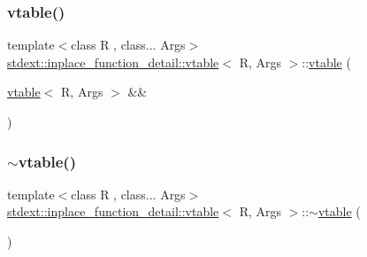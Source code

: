\mbox{\label{structstdext_1_1inplace__function__detail_1_1vtable_acd6e85bc1036c1681fcef551f9935062}} 
\subsubsection{\texorpdfstring{vtable()}{vtable()}\hspace{0.1cm}{\footnotesize\ttfamily [8/8]}}
{\footnotesize\ttfamily template$<$class R , class... Args$>$ \\
\hyperlink{structstdext_1_1inplace__function__detail_1_1vtable}{stdext\+::inplace\+\_\+function\+\_\+detail\+::vtable}$<$ R, Args $>$\+::\hyperlink{structstdext_1_1inplace__function__detail_1_1vtable}{vtable} (\begin{DoxyParamCaption}\item[{\hyperlink{structstdext_1_1inplace__function__detail_1_1vtable}{vtable}$<$ R, Args $>$ \&\&}]{ }\end{DoxyParamCaption})\hspace{0.3cm}{\ttfamily [delete]}}

\mbox{\label{structstdext_1_1inplace__function__detail_1_1vtable_a9358b57ba7aa53ea5209476490644148}} 
\subsubsection{\texorpdfstring{$\sim$vtable()}{~vtable()}\hspace{0.1cm}{\footnotesize\ttfamily [2/2]}}
{\footnotesize\ttfamily template$<$class R , class... Args$>$ \\
\hyperlink{structstdext_1_1inplace__function__detail_1_1vtable}{stdext\+::inplace\+\_\+function\+\_\+detail\+::vtable}$<$ R, Args $>$\+::$\sim$\hyperlink{structstdext_1_1inplace__function__detail_1_1vtable}{vtable} (\begin{DoxyParamCaption}{ }\end{DoxyParamCaption})\hspace{0.3cm}{\ttfamily [default]}}



